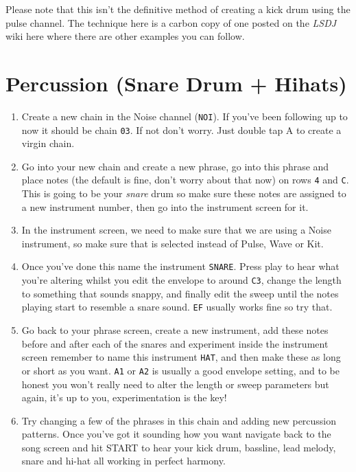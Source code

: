 \documentclass[]{article}
\newcommand{\buttonStyle}[1]{\textsf{#1}\xspace}
\newcommand{\bA}{\buttonStyle{A}}
\newcommand{\bStart}{\buttonStyle{{START}}}
\newcommand{\gbtxt}[1]{\texttt{#1}\xspace}
\newcommand{\lsdj}{\textit{LSDJ}\xspace}
\begin{document}
Please note that this isn't the definitive method of creating a kick drum using the pulse channel. The technique here is a carbon copy of one posted on the \lsdj wiki here where there are other examples you can follow.


\section{Percussion (Snare Drum + Hihats)}

\begin{enumerate}


\item Create a new chain in the Noise channel (\gbtxt{NOI}). If you've been following up to now it should be chain \gbtxt{03}. If not don't worry. Just double tap \bA to create a virgin chain.

\item Go into your new chain and create a new phrase, go into this phrase and place notes (the default is fine, don't worry about that now) on rows \gbtxt{4} and \gbtxt{C}. This is going to be your \textit{snare} drum so make sure these notes are assigned to a new instrument number, then go into the instrument screen for it.

\item In the instrument screen, we need to make sure that we are using a Noise instrument, so make sure that is selected instead of Pulse, Wave or Kit.

\item Once you've done this name the instrument \gbtxt{SNARE}. Press play to hear what you're altering whilst you edit the envelope to around \gbtxt{C3}, change the length to something that sounds snappy, and finally edit the sweep until the notes playing start to resemble a snare sound. \gbtxt{EF} usually works fine so try that.

\item Go back to your phrase screen, create a new instrument, add these notes before and after each of the snares and experiment inside the instrument screen remember to name this instrument \gbtxt{HAT}, and then make these as long or short as you want. \gbtxt{A1} or \gbtxt{A2} is usually a good envelope setting, and to be honest you won't really need to alter the length or sweep parameters but again, it's up to you, experimentation is the key!

\item Try changing a few of the phrases in this chain and adding new percussion patterns. Once you've got it sounding how you want navigate back to the song screen and hit \bStart to hear your kick drum, bassline, lead melody, snare and hi-hat all working in perfect harmony.

\end{enumerate}
\end{document}
